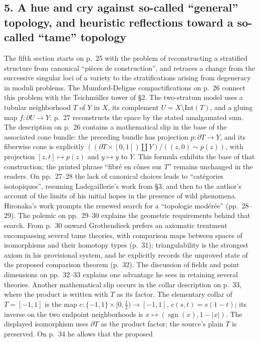 \subsection*{5. A hue and cry against so-called ``general'' topology, and heuristic reflections toward a so-called ``tame'' topology}
The fifth section starts on p.~25 with the problem of reconstructing a
stratified structure from canonical ``pièces de construction'', and
retraces a change from the successive singular loci of a variety to the
stratifications arising from degeneracy in moduli problems. The
Mumford-Deligne compactifications on p.~26 connect this problem with the
Teichmüller tower of \S2. The two-stratum model uses a tubular neighborhood
$T$ of $Y$ in $X$, its complement $U=X\setminus\mathrm{Int}(T)$, and a
gluing map $f:\partial U\longrightarrow Y$; p.~27 reconstructs the space
by the stated amalgamated sum. The description on p.~26 contains a
mathematical slip in the base of the associated cone bundle: the preceding
bundle has projection $p:\partial T\longrightarrow Y$, and its fiberwise
cone is explicitly
$((\partial T\times[0,1])\amalg Y)/((z,0)\sim p(z))$,
with projection $[z,t]\mapsto p(z)$ and $y\mapsto y$ to $Y$.
This formula exhibits the base of that construction; the printed phrase
``fibré en cônes sur $T$'' remains unchanged in the readers. On pp.~27--28
the lack of canonical choices leads to ``catégories isotopiques'',
resuming Ladegaillerie's work from \S3, and then to the author's account
of the limits of his initial hopes in the presence of wild phenomena.
Hironaka's work prompts the renewed search for a ``topologie modérée''
(pp.~28--29). The polemic on pp.~29--30 explains the geometric
requirements behind that search. From p.~30 onward Grothendieck prefers
an axiomatic treatment encompassing several tame theories, with
comparison maps between spaces of isomorphisms and their homotopy types
(p.~31); triangulability is the strongest axiom in his provisional system,
and he explicitly records the unproved state of the proposed comparison
theorem (p.~32). The discussion of fields and point dimensions on
pp.~32--33 explains one advantage he sees in retaining several theories.
Another mathematical slip occurs in the collar description on p.~33,
where the product is written with $T$ as its factor. The elementary collar
of $T=[-1,1]$ is the map
$c:\{-1,1\}\times[0,\tfrac12)\longrightarrow[-1,1]$,
$c(s,t)=s(1-t)$; its inverse on the two endpoint
neighborhoods is $x\mapsto(\operatorname{sgn}(x),1-|x|)$.
The displayed isomorphism uses $\partial T$ as the product factor;
the source's plain $T$ is preserved. On p.~34 he allows that the proposed
